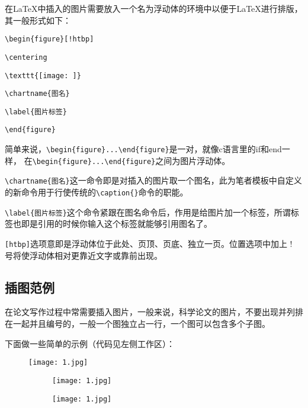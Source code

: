 在\LaTeX 中插入的图片需要放入一个名为浮动体的环境中以便于\LaTeX 进行排版，其一般形式如下：

\verb|\begin{figure}[!htbp]|\par
\verb|\centering|\par
\verb|\texttt{[image: ]}|\par
\verb|\chartname{图名}|\par
\verb|\label{图片标签}|\par
\verb|\end{figure}|

简单来说，\verb|\begin{figure}...\end{figure}|是一对，就像c语言里的if和end一样，
在\verb|\begin{figure}...\end{figure}|之间为图片浮动体。

\verb|\chartname{图名}|这一命令即是对插入的图片取一个图名，此为笔者模板中自定义的新命令用于行使传统的\verb|\caption{}|命令的职能。

\verb|\label{图片标签}|这个命令紧跟在图名命令后，作用是给图片加一个标签，所谓标签也即是引用的时候你输入这个标签就能够引用图名了。

\verb|[htbp]|选项意即是浮动体位于此处、页顶、页底、独立一页。位置选项中加上 ! 号将使浮动体相对更靠近文字或靠前出现。

\subsection{插图范例}

在论文写作过程中常需要插入图片，一般来说，科学论文的图片，不要出现并列排在一起并且编号的，一般一个图独立占一行，一个图可以包含多个子图。

下面做一些简单的示例（代码见左侧工作区）：

\begin{figure}[htb]
    \centering
     \texttt{[image: 1.jpg]}
     \label{fig:1}
\end{figure}

\begin{figure}
\begin{subfigure}{.48\textwidth}
  \centering
  \label{fig:2a}
  \texttt{[image: 1.jpg]}  
\end{subfigure}
\hfil
\begin{subfigure}{.48\textwidth}
  \centering
  \label{fig:2b}
  \texttt{[image: 1.jpg]}
\end{subfigure}
\label{fig:2}
\end{figure}


